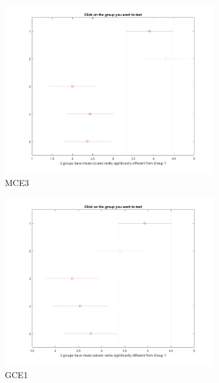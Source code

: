 \begin{figure}
\begin{subfigure}[b]{0.49\linewidth}
		\includegraphics[width=\linewidth]{Figures/NMELA_FB_P3}
		\caption{MCE3} \label{fig:M3} 
	\end{subfigure}
	\begin{subfigure}[b]{0.49\linewidth}
		\includegraphics[width=\linewidth]{Figures/NMELA_FB_P4}
		\caption{GCE1} \label{fig:M4} 
	\end{subfigure}
	\begin{subfigure}[b]{0.49\linewidth}

\end{subfigure}
\end{figure}
